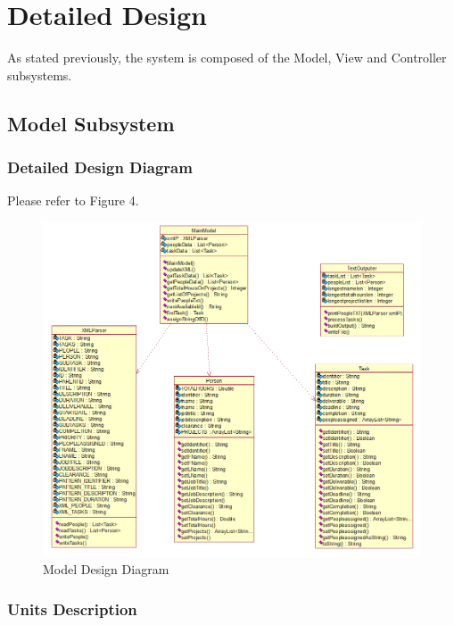 \documentclass[12pt]{article}
\begin{document}
\section{Detailed Design} \label{sec:detail}

As stated previously, the system is composed of the Model, View and Controller subsystems.

\subsection{Model Subsystem}

\subsubsection{Detailed Design Diagram}

Please refer to Figure 4.
\begin{figure}[htbp]
\begin{center} \includegraphics[scale=.7]{Diagrams/model_diagram.png} \end{center}
\caption{Model Design Diagram}
\label{fig:model-diagram1}
\end{figure}

\subsubsection{Units Description}
\end{document}
